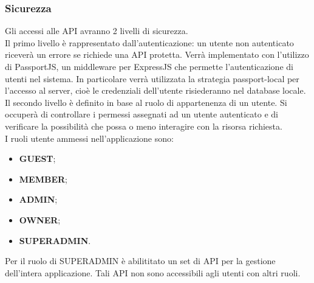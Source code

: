 \subsubsection{Sicurezza}
Gli accessi alle API avranno 2 livelli di sicurezza. \\
Il primo livello è rappresentato dall'autenticazione: un utente non autenticato riceverà un errore se richiede una API protetta. Verrà implementato con l'utilizzo di PassportJS, un middleware per ExpressJS che permette l'autenticazione di utenti nel sistema. In particolare verrà utilizzata la strategia passport-local per l'accesso al server, cioè le credenziali dell'utente risiederanno nel database locale. \\
Il secondo livello è definito in base al ruolo di appartenenza di un utente. Si occuperà di controllare i permessi assegnati ad un utente autenticato e di verificare la possibilità che possa o meno interagire con la risorsa richiesta. \\
I ruoli utente ammessi nell'applicazione sono: 
\begin{itemize}
\item \textbf{GUEST};
\item \textbf{MEMBER};
\item \textbf{ADMIN};
\item \textbf{OWNER};
\item \textbf{SUPERADMIN}.
\end{itemize}
Per il ruolo di SUPERADMIN è abilititato un set di API per la gestione dell'intera applicazione. Tali API non sono accessibili agli utenti con altri ruoli.